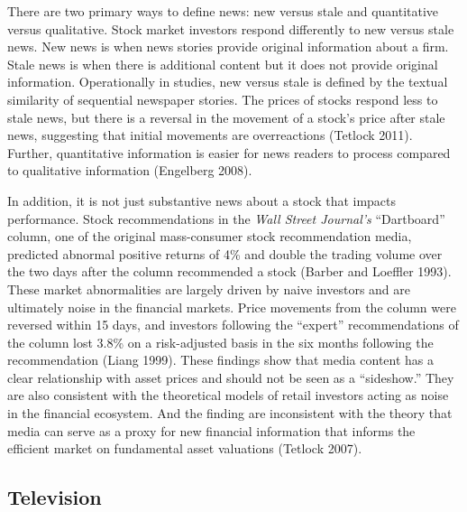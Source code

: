 \documentclass[12pt,]{article}
\begin{document}
There are two primary ways to define news: new versus stale and
quantitative versus qualitative. Stock market investors respond
differently to new versus stale news. New news is when news stories
provide original information about a firm. Stale news is when there is
additional content but it does not provide original information.
Operationally in studies, new versus stale is defined by the textual
similarity of sequential newspaper stories. The prices of stocks respond
less to stale news, but there is a reversal in the movement of a stock's
price after stale news, suggesting that initial movements are
overreactions (Tetlock 2011). Further, quantitative information is
easier for news readers to process compared to qualitative information
(Engelberg 2008).

In addition, it is not just substantive news about a stock that impacts
performance. Stock recommendations in the \emph{Wall Street Journal's}
``Dartboard'' column, one of the original mass-consumer stock
recommendation media, predicted abnormal positive returns of 4\% and
double the trading volume over the two days after the column recommended
a stock (Barber and Loeffler 1993). These market abnormalities are
largely driven by naive investors and are ultimately noise in the
financial markets. Price movements from the column were reversed within
15 days, and investors following the ``expert'' recommendations of the
column lost 3.8\% on a risk-adjusted basis in the six months following
the recommendation (Liang 1999). These findings show that media content
has a clear relationship with asset prices and should not be seen as a
``sideshow.'' They are also consistent with the theoretical models of
retail investors acting as noise in the financial ecosystem. And the
finding are inconsistent with the theory that media can serve as a proxy
for new financial information that informs the efficient market on
fundamental asset valuations (Tetlock 2007).

\hypertarget{television}{%
\subsection{Television}\label{television}}
\end{document}
